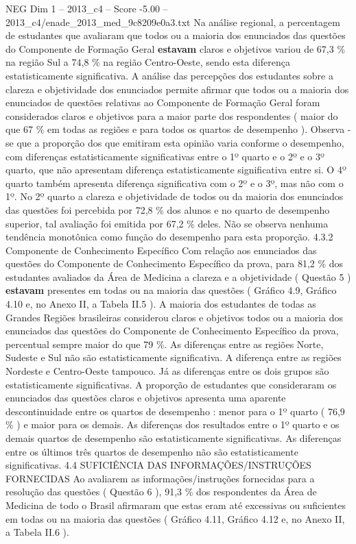 \begin{textsample}{NEG Dim 1 – 2013\_c4 – Score -5.00 – 2013\_c4/enade\_2013\_med\_9c8209e0a3.txt}
Na análise regional, a percentagem de estudantes que avaliaram que todos ou a maioria dos enunciados das questões do Componente de Formação Geral \textbf{estavam} claros e objetivos variou de 67,3 \% na região Sul a 74,8 \% na região Centro-Oeste, sendo esta diferença estatisticamente significativa.
A análise das percepções dos estudantes sobre a clareza e objetividade dos enunciados permite afirmar que todos ou a maioria dos enunciados de questões relativas ao Componente de Formação Geral foram considerados claros e objetivos para a maior parte dos respondentes ( maior do que 67 \% em todas as regiões e para todos os quartos de desempenho ).
Observa -se que a proporção dos que emitiram esta opinião varia conforme o desempenho, com diferenças estatisticamente significativas entre o 1º quarto e o 2º e o 3º quarto, que não apresentam diferença estatisticamente significativa entre si.
O 4º quarto também apresenta diferença significativa com o 2º e o 3º, mas não com o 1º.
No 2º quarto a clareza e objetividade de todos ou da maioria dos enunciados das questões foi percebida por 72,8 \% dos alunos e no quarto de desempenho superior, tal avaliação foi emitida por 67,2 \% deles.
Não se observa nenhuma tendência monotônica como função do desempenho para esta proporção. 4.3.2 Componente de Conhecimento Específico Com relação aos enunciados das questões do Componente de Conhecimento Específico da prova, para 81,2 \% dos estudantes avaliados da Área de Medicina a clareza e a objetividade ( Questão 5 ) \textbf{estavam} presentes em todas ou na maioria das questões ( Gráfico 4.9, Gráfico 4.10 e, no Anexo II, a Tabela II.5 ).
A maioria dos estudantes de todas as Grandes Regiões brasileiras considerou claros e objetivos todos ou a maioria dos enunciados das questões do Componente de Conhecimento Específico da prova, percentual sempre maior do que 79 \%.
As diferenças entre as regiões Norte, Sudeste e Sul não são estatisticamente significativa.
A diferença entre as regiões Nordeste e Centro-Oeste tampouco.
Já as diferenças entre os dois grupos são estatisticamente significativas.
A proporção de estudantes que consideraram os enunciados das questões claros e objetivos apresenta uma aparente descontinuidade entre os quartos de desempenho : menor para o 1º quarto ( 76,9 \% ) e maior para os demais.
As diferenças dos resultados entre o 1º quarto e os demais quartos de desempenho são estatisticamente significativas.
As diferenças entre os últimos três quartos de desempenho não são estatisticamente significativas. 4.4 SUFICIÊNCIA DAS INFORMAÇÕES/INSTRUÇÕES FORNECIDAS Ao avaliarem as informações/instruções fornecidas para a resolução das questões ( Questão 6 ), 91,3 \% dos respondentes da Área de Medicina de todo o Brasil afirmaram que estas eram até excessivas ou suficientes em todas ou na maioria das questões ( Gráfico 4.11, Gráfico 4.12 e, no Anexo II, a Tabela II.6 ).

\end{textsample}
